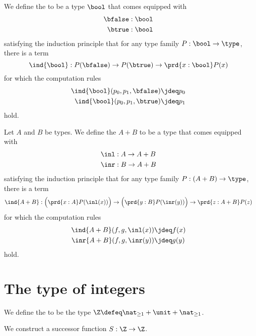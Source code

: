 \begin{defn}
We define the  to be a type $\bool$ that comes equipped with
\begin{align*}
\bfalse & : \bool \\
\btrue & : \bool
\end{align*}
satisfying the induction principle that for any type family $P:\bool\to\type$, there is a term
\begin{equation*}
\ind{\bool} : P(\bfalse)\to P(\btrue)\to \prd{x:\bool}P(x)
\end{equation*}
for which the computation rules
\begin{align*}
\ind{\bool}(p_0,p_1,\bfalse) & \jdeq p_0 \\
\ind{\bool}(p_0,p_1,\btrue) & \jdeq p_1
\end{align*}
hold.
\end{defn}

\begin{defn}
Let $A$ and $B$ be types. We define the  $A+B$ to be a type that comes equipped with
\begin{align*}
\inl & : A \to A+B \\
\inr & : B \to A+B
\end{align*}
satisfying the induction principle that for any type family $P:(A+B)\to\type$, there is a term
\begin{equation*}
\ind{A+B} : \Big(\prd{x:A}P(\inl(x))\Big)\to\Big(\prd{y:B}P(\inr(y))\Big)\to\prd{z:A+B}P(z)
\end{equation*}
for which the computation rules
\begin{align*}
\ind{A+B}(f,g,\inl(x)) & \jdeq f(x) \\
\inr{A+B}(f,g,\inr(y)) & \jdeq g(y)
\end{align*}
hold.
\end{defn}

\section{The type of integers}
\begin{defn}
We define the  to be the type $\Z\defeq\nat_{\geq 1}+\unit+\nat_{\geq 1}$.
\end{defn}

\begin{defn}
We construct a successor function $S:\Z\to\Z$.
\end{defn}

\begin{constr}

\end{constr}

